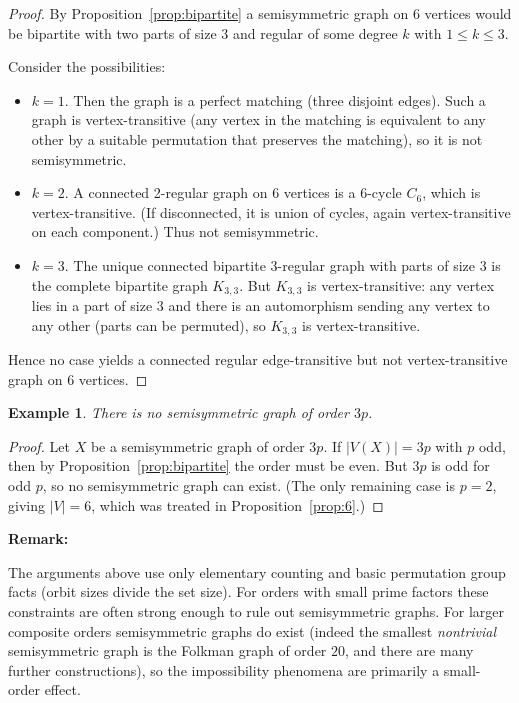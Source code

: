 \documentclass[12pt,a4paper,openany]{book}
\newtheorem{example}{Example}[section]
\begin{document}
\begin{proof}
By Proposition~\ref{prop:bipartite} a semisymmetric graph on $6$ vertices would be bipartite with two parts of size $3$ and regular of some degree $k$ with $1\le k\le3$.

Consider the possibilities:

\begin{itemize}
\item $k=1$. Then the graph is a perfect matching (three disjoint edges). Such a graph is vertex-transitive (any vertex in the matching is equivalent to any other by a suitable permutation that preserves the matching), so it is not semisymmetric.

\item $k=2$. A connected 2-regular graph on 6 vertices is a $6$-cycle $C_6$, which is vertex-transitive. (If disconnected, it is union of cycles, again vertex-transitive on each component.) Thus not semisymmetric.

\item $k=3$. The unique connected bipartite 3-regular graph with parts of size $3$ is the complete bipartite graph $K_{3,3}$. But $K_{3,3}$ is vertex-transitive: any vertex lies in a part of size $3$ and there is an automorphism sending any vertex to any other (parts can be permuted), so $K_{3,3}$ is vertex-transitive.
\end{itemize}

Hence no case yields a connected regular edge-transitive but not vertex-transitive graph on 6 vertices.
\end{proof}

\begin{example}
 There is no semisymmetric graph of order $3p$.
\end{example}

\begin{proof}
 Let $X$ be a semisymmetric graph of order $3p$. If $|V(X)|=3p$ with $p$ odd, then by Proposition~\ref{prop:bipartite} the order must be even. But $3p$ is odd for odd $p$, so no semisymmetric graph can exist. (The only remaining case is $p=2$, giving $|V|=6$, which was treated in Proposition~\ref{prop:6}.)
\end{proof}


\noindent\textbf{Remark:}

The arguments above use only elementary counting and basic permutation group facts (orbit sizes divide the set size). For orders with small prime factors these constraints are often strong enough to rule out semisymmetric graphs. For larger composite orders semisymmetric graphs do exist (indeed the smallest \emph{nontrivial} semisymmetric graph is the Folkman graph of order $20$, and there are many further constructions), so the impossibility phenomena are primarily a small-order effect.
\bigskip
\end{document}
